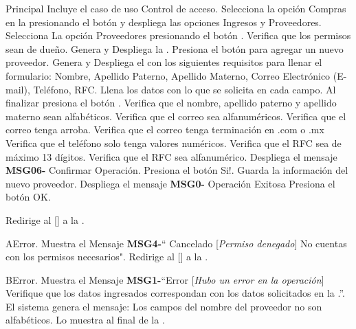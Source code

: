 	\begin{UCtrayectoria}{Principal}
		\UCpaso Incluye el caso de uso  Control de acceso.
		\UCpaso[\UCactor] Selecciona la opción Compras en la  presionando el botón  y despliega las opciones Ingresos y Proveedores.
		\UCpaso[\UCactor] Selecciona La opción Proveedores presionando el botón .
		\UCpaso Verifica que los permisos sean de dueño. 
		\UCpaso Genera y Despliega la .
		\UCpaso [\UCactor] Presiona el botón  para agregar un nuevo proveedor.
		\UCpaso Genera y Despliega el  con los siguientes requisitos para llenar el formulario: Nombre, Apellido Paterno, Apellido Materno, Correo Electrónico (E-mail), Teléfono, RFC.
		\UCpaso[\UCactor] Llena los datos con lo que se solicita en cada campo.
		\UCpaso[\UCactor]Al finalizar presiona el botón .
		\UCpaso Verifica que el nombre, apellido paterno y apellido materno sean alfabéticos. 
		\UCpaso Verifica que el correo sea alfanuméricos. 
		\UCpaso Verifica que el correo tenga arroba.  
		\UCpaso Verifica que el correo tenga terminación en .com o .mx 
		\UCpaso Verifica que el teléfono solo tenga valores numéricos. 
		\UCpaso Verifica que el RFC sea de máximo 13 dígitos. 
		\UCpaso Verifica que el RFC sea alfanumérico. 
		\UCpaso Despliega el mensaje {\bf MSG06-} {Confirmar Operación}. 
		\UCpaso [\UCactor] Presiona el botón {Si!}. 
		\UCpaso Guarda la información del nuevo proveedor.
		\UCpaso Despliega el mensaje {\bf MSG0-} {Operación Exitosa}
		\UCpaso [\UCactor] Presiona el botón {OK}.

		\UCpaso Redirige al [\UCactor] a la  .
	\end{UCtrayectoria}


\begin{UCtrayectoriaA}{A}{Error.}
			\UCpaso Muestra el Mensaje {\bf MSG4-}`` Cancelado [{\em Permiso denegado}] No cuentas con los permisos necesarios".
			\UCpaso  Redirige al [\UCactor] a la .
		\end{UCtrayectoriaA}

\begin{UCtrayectoriaA}{B}{Error.}
			\UCpaso Muestra el Mensaje {\bf MSG1-}``Error [{\em Hubo un error en la operación}] Verifique que los datos ingresados correspondan con los datos solicitados en la  .''.
			\UCpaso El sistema genera el mensaje: Los campos del nombre del proveedor no son alfabéticos.
			\UCpaso Lo muestra al final de la  .
		\end{UCtrayectoriaA}


